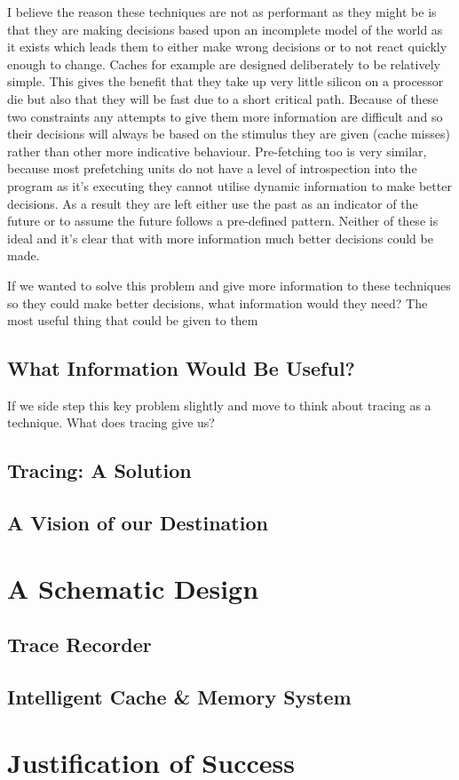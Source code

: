 
I believe the reason these techniques are not as performant as they might be is that they are making decisions based upon an incomplete model of the world as it exists which leads them to either make wrong decisions or to not react quickly enough to change. Caches for example are designed deliberately to be relatively simple. This gives the benefit that they take up very little silicon on a processor die but also that they will be fast due to a short critical path. Because of these two constraints any attempts to give them more information are difficult and so their decisions will always be based on the stimulus they are given (cache misses) rather than other more indicative behaviour. Pre-fetching too is very similar, because most prefetching units do not have a level of introspection into the program as it's executing they cannot utilise dynamic information to make better decisions. As a result they are left either use the past as an indicator of the future or to assume the future follows a pre-defined pattern. Neither of these is ideal and it's clear that with more information much better decisions could be made.

If we wanted to solve this problem and give more information to these techniques so they could make better decisions, what information would they need? The most useful thing that could be given to them 

\subsection{What Information Would Be Useful?}

If we side step this key problem slightly and move to think about tracing as a technique. What does tracing give us?

\subsection{Tracing: A Solution}

\subsection{A Vision of our Destination}

\section{A Schematic Design}

\subsection{Trace Recorder}

\subsection{Intelligent Cache \& Memory System}

\section{Justification of Success}